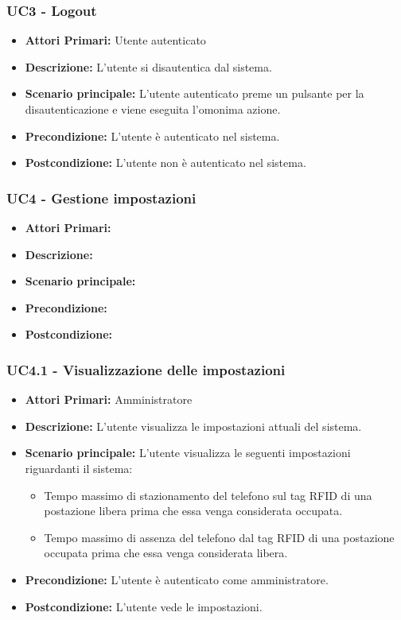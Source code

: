 \subsubsection{ UC3 - Logout}
\begin{itemize}
           	\item\textbf{Attori Primari:} 
           	Utente autenticato
           	\item\textbf{Descrizione:} 
           	L'utente si disautentica dal sistema.
           	\item\textbf{Scenario principale:} 
           	L'utente autenticato preme un pulsante per la disautenticazione e viene eseguita l'omonima azione.
           	\item\textbf{Precondizione:} 
           	L'utente è autenticato nel sistema.
           	\item\textbf{Postcondizione:}
           	L'utente non è autenticato nel sistema.
\end{itemize}

\subsubsection{ UC4 - Gestione impostazioni}
\begin{itemize}
           	\item\textbf{Attori Primari:} 
           	\item\textbf{Descrizione:} 
           	\item\textbf{Scenario principale:} 
           	\item\textbf{Precondizione:} 
           	\item\textbf{Postcondizione:}
\end{itemize}

\subsubsection{ UC4.1 - Visualizzazione delle impostazioni}
\begin{itemize}
	\item\textbf{Attori Primari:} 
	Amministratore
	\item\textbf{Descrizione:} 
	L'utente visualizza le impostazioni attuali del sistema.
	\item\textbf{Scenario principale:} 
	L'utente visualizza le seguenti impostazioni riguardanti il sistema:
	\begin{itemize}
		\item Tempo massimo di stazionamento del telefono sul tag RFID di una postazione libera prima che essa venga considerata occupata.
		\item Tempo massimo di assenza del telefono dal tag RFID di una postazione occupata prima che essa venga considerata libera.
	\end{itemize}
	\item\textbf{Precondizione:} 
	L'utente è autenticato come amministratore.
	\item\textbf{Postcondizione:}
	L'utente vede le impostazioni.
\end{itemize}

